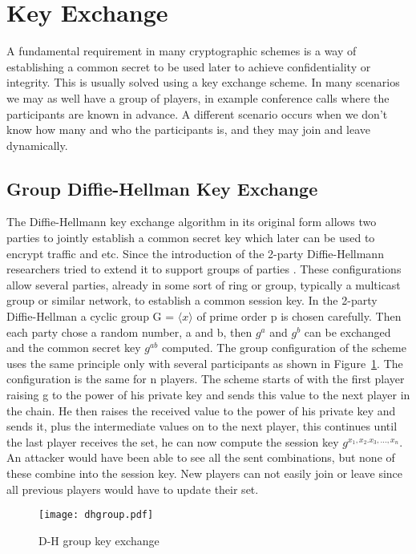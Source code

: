 \section{Key Exchange}\label{sec:key_exchange}
A fundamental requirement in many cryptographic schemes is a way of establishing a common secret to be used later to achieve confidentiality or integrity. This is usually solved using a key exchange scheme. In many scenarios we may as well have a group of players, in example conference calls where the participants are known in advance. A different scenario occurs when we don't know how many and who the participants is, and they may join and leave dynamically. 

\subsection{Group Diffie-Hellman Key Exchange}
The Diffie-Hellmann key exchange algorithm in its original form allows two parties to jointly establish a common secret key which later can be used to encrypt traffic and etc. Since the introduction of the 2-party Diffie-Hellmann researchers tried to extend it to support groups of parties \cite{steiner1996diffie, groupDH}. These configurations allow several parties, already in some sort of ring or group, typically a multicast group or similar network, to establish a common session key. In the 2-party Diffie-Hellman a cyclic group G =  $\langle x \rangle$ of prime order p is chosen carefully. Then each party chose a random number, a and b, then $g^a$ and $g^b$ can be exchanged and the common secret key $g^{ab}$ computed. The group configuration of the scheme uses the same principle only with several participants as shown in Figure~\ref{fig:dhgroup}. The configuration is the same for n players. The scheme starts of with the first player raising g to the power of his private key and sends this value to the next player in the chain. He then raises the received value to the power of his private key and sends it, plus the intermediate values on to the next player, this continues until the last player receives the set, he can now compute the session key $g^{x_1,x_2.x_3,...,x_n}$. An attacker would have been able to see all the sent combinations, but none of these combine into the session key. New players can not easily join or leave since all previous players would have to update their set. 

\begin{figure}
\centering
\texttt{[image: dhgroup.pdf]}
\caption{D-H group key exchange}
\label{fig:dhgroup}
\end{figure}

